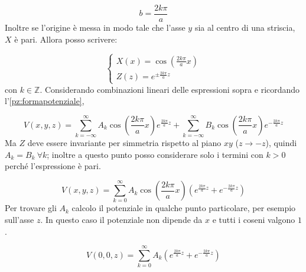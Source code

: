\documentclass[../main.tex]{subfiles}
\begin{document}
\begin{equation}
  b=\frac{2k \pi}{a}
\end{equation}
Inoltre se l'origine \`e messa in modo tale che l'asse $y$ sia al centro di una striscia, $X$ \`e pari. Allora posso scrivere:

\begin{equation}
  \left\{
    \begin{aligned}
      X(x)=\cos \left(\frac{2 k \pi}{a}x \right) \\
      Z(z)=e^{\pm \frac{2 k \pi}{a}z}
    \end{aligned}
  \right.
\end{equation}
con $k\in \mathbb Z$. Considerando combinazioni lineari delle espressioni sopra e ricordando l'\cref{pz:formapotenziale},

\begin{equation}
  V(x,y,z)=\sum_{k=-\infty}^\infty A_k \cos \left(\frac{2 k \pi}{a}x \right) e^{\frac{2 k \pi}{a} z } + \sum_{k=-\infty}^\infty B_k \cos \left(\frac{2 k \pi}{a}x \right) e^{- \frac{2 k \pi}{a} z }
\end{equation}
Ma $Z$ deve essere invariante per simmetria rispetto al piano $xy$ ($z \to -z$), quindi $A_k=B_k \ \forall k$; %
inoltre a questo punto posso considerare solo i termini con $k>0$ perch\'e l'espressione \`e pari.

\begin{equation}
  V(x,y,z)=\sum_{k=0}^\infty A_k \cos \left(\frac{2 k \pi}{a}x \right) \left(e^{\frac{2 k \pi}{a} z } + e^{- \frac{2 k \pi}{a} z } \right)
\end{equation}
Per trovare gli $A_k$ calcolo il potenziale in qualche punto particolare, per esempio sull'asse $z$.
In questo caso il potenziale non dipende da $x$ e tutti i coseni valgono $1$.

\begin{equation}
  V(0,0,z)=\sum_{k=0}^\infty A_k \left( e^{\frac{2 k \pi}{a} z } + e^{- \frac{2 k \pi}{a} z } \right)
\end{equation}
\end{document}
